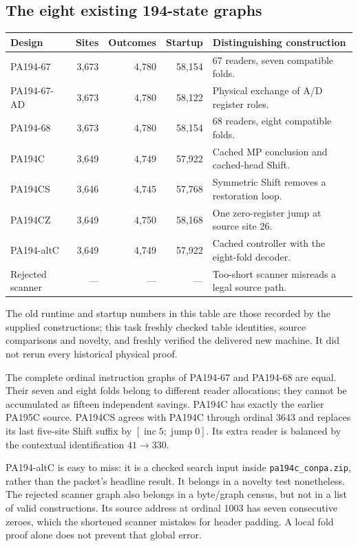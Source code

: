 \documentclass[11pt,letterpaper]{article}
\newcommand{\file}[1]{\texttt{\nolinkurl{#1}}}
\begin{document}
\subsection{The eight existing 194-state graphs}

\begin{center}\small
\begin{tabularx}{\textwidth}{@{}lrrrX@{}}
\toprule
Design & Sites & Outcomes & Startup & Distinguishing construction\\
\midrule
PA194-67 & 3,673 & 4,780 & 58,154 & 67 readers, seven compatible folds.\\
PA194-67-AD & 3,673 & 4,780 & 58,122 & Physical exchange of A/D register roles.\\
PA194-68 & 3,673 & 4,780 & 58,154 & 68 readers, eight compatible folds.\\
PA194C & 3,649 & 4,749 & 57,922 & Cached MP conclusion and cached-head Shift.\\
PA194CS & 3,646 & 4,745 & 57,768 & Symmetric Shift removes a restoration loop.\\
PA194CZ & 3,649 & 4,750 & 58,168 & One zero-register jump at source site 26.\\
PA194-altC & 3,649 & 4,749 & 57,922 & Cached controller with the eight-fold decoder.\\
Rejected scanner & --- & --- & --- & Too-short scanner misreads a legal source path.\\
\bottomrule
\end{tabularx}
\end{center}
The old runtime and startup numbers in this table are those recorded by
the supplied constructions; this task freshly checked table identities,
source comparisons and novelty, and freshly verified the delivered new
machine. It did not rerun every historical physical proof.

The complete ordinal instruction graphs of PA194-67 and PA194-68 are
equal. Their seven and eight folds belong to different reader allocations;
they cannot be accumulated as fifteen independent savings. PA194C has
exactly the earlier PA195C source. PA194CS agrees with PA194C through
ordinal 3643 and replaces its last five-site Shift suffix by
\([\operatorname{inc}5;\operatorname{jump}0]\). Its extra reader is
balanced by the contextual identification \(41\to330\).

PA194-altC is easy to miss: it is a checked search input inside
\file{pa194c_conpa.zip}, rather than the packet's headline result. It
belongs in a novelty test nonetheless. The rejected scanner graph also
belongs in a byte/graph census, but not in a list of valid constructions.
Its source address at ordinal 1003 has seven consecutive zeroes, which
the shortened scanner mistakes for header padding. A local fold proof
alone does not prevent that global error.
\end{document}
